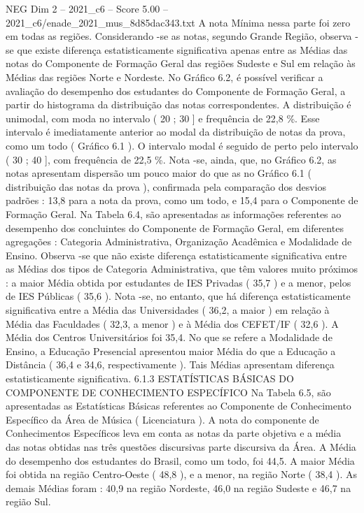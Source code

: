 \begin{textsample}{NEG Dim 2 – 2021\_c6 – Score 5.00 – 2021\_c6/enade\_2021\_mus\_8d85dac343.txt}
A nota Mínima nessa parte foi zero em todas as regiões.
Considerando -se as notas, segundo Grande Região, observa -se que existe diferença estatisticamente significativa apenas entre as Médias das notas do Componente de Formação Geral das regiões Sudeste e Sul em relação às Médias das regiões Norte e Nordeste.
No Gráfico 6.2, é possível verificar a avaliação do desempenho dos estudantes do Componente de Formação Geral, a partir do histograma da distribuição das notas correspondentes.
A distribuição é unimodal, com moda no intervalo ( 20 ; 30 ] e frequência de 22,8 \%.
Esse intervalo é imediatamente anterior ao modal da distribuição de notas da prova, como um todo ( Gráfico 6.1 ).
O intervalo modal é seguido de perto pelo intervalo ( 30 ; 40 ], com frequência de 22,5 \%.
Nota -se, ainda, que, no Gráfico 6.2, as notas apresentam dispersão um pouco maior do que as no Gráfico 6.1 ( distribuição das notas da prova ), confirmada pela comparação dos desvios padrões : 13,8 para a nota da prova, como um todo, e 15,4 para o Componente de Formação Geral.
Na Tabela 6.4, são apresentadas as informações referentes ao desempenho dos concluintes do Componente de Formação Geral, em diferentes agregações : Categoria Administrativa, Organização Acadêmica e Modalidade de Ensino.
Observa -se que não existe diferença estatisticamente significativa entre as Médias dos tipos de Categoria Administrativa, que têm valores muito próximos : a maior Média obtida por estudantes de IES Privadas ( 35,7 ) e a menor, pelos de IES Públicas ( 35,6 ).
Nota -se, no entanto, que há diferença estatisticamente significativa entre a Média das Universidades ( 36,2, a maior ) em relação à Média das Faculdades ( 32,3, a menor ) e à Média dos CEFET/IF ( 32,6 ).
A Média dos Centros Universitários foi 35,4.
No que se refere a Modalidade de Ensino, a Educação Presencial apresentou maior Média do que a Educação a Distância ( 36,4 e 34,6, respectivamente ).
Tais Médias apresentam diferença estatisticamente significativa. 6.1.3 ESTATÍSTICAS BÁSICAS DO COMPONENTE DE CONHECIMENTO ESPECÍFICO Na Tabela 6.5, são apresentadas as Estatísticas Básicas referentes ao Componente de Conhecimento Específico da Área de Música ( Licenciatura ).
A nota do componente de Conhecimentos Específicos leva em conta as notas da parte objetiva e a média das notas obtidas nas três questões discursivas parte discursiva da Área.
A Média do desempenho dos estudantes do Brasil, como um todo, foi 44,5.
A maior Média foi obtida na região Centro-Oeste ( 48,8 ), e a menor, na região Norte ( 38,4 ).
As demais Médias foram : 40,9 na região Nordeste, 46,0 na região Sudeste e 46,7 na região Sul.

\end{textsample}
